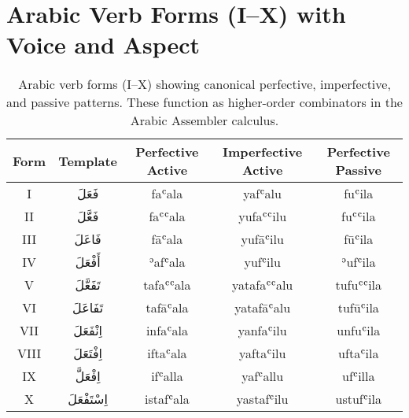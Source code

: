 \documentclass[12pt]{article}
\begin{document}
\section{Arabic Verb Forms (I–X) with Voice and Aspect}
\label{app:forms}
\renewcommand{\arraystretch}{1.3}
\begin{table}[h!]
\centering
\begin{tabular}{|c|c|c|c|c|}
\hline
Form & Template & Perfective Active & Imperfective Active & Perfective Passive \\
\hline
I   & فَعَلَ & faʿala & yafʿalu & fuʿila \\
II  & فَعَّلَ & faʿʿala & yufaʿʿilu & fuʿʿila \\
III & فَاعَلَ & fāʿala & yufāʿilu & fūʿila \\
IV  & أَفْعَلَ & ʾafʿala & yufʿilu & ʾufʿila \\
V   & تَفَعَّلَ & tafaʿʿala & yatafaʿʿalu & tufuʿʿila \\
VI  & تَفَاعَلَ & tafāʿala & yatafāʿalu & tufūʿila \\
VII & اِنْفَعَلَ & infaʿala & yanfaʿilu & unfuʿila \\
VIII& اِفْتَعَلَ & iftaʿala & yaftaʿilu & uftaʿila \\
IX  & اِفْعَلَّ & ifʿalla & yafʿallu & ufʿilla \\
X   & اِسْتَفْعَلَ & istafʿala & yastafʿilu & ustufʿila \\
\hline
\end{tabular}
\caption{Arabic verb forms (I–X) showing canonical perfective, imperfective, and passive patterns. These function as higher-order combinators in the Arabic Assembler calculus.}
\end{table}
\end{document}
